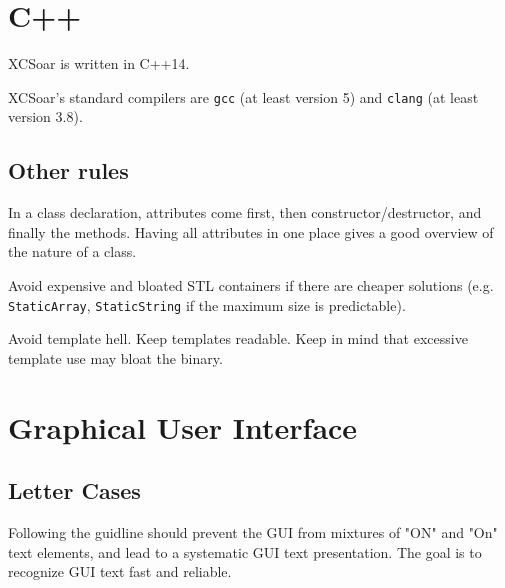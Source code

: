 \documentclass[a4paper,12pt]{refrep}
\begin{document}
\section{C++}

XCSoar is written in C++14.

XCSoar's standard compilers are \texttt{gcc} (at least version 5) and
\texttt{clang} (at least version 3.8).

\subsection{Other rules}

In a class declaration, attributes come first, then
constructor/destructor, and finally the methods.  Having all
attributes in one place gives a good overview of the nature of a
class.

Avoid expensive and bloated STL containers if there are cheaper
solutions (e.g. \texttt{StaticArray}, \texttt{StaticString} if the
maximum size is predictable).

Avoid template hell.  Keep templates readable.  Keep in mind that
excessive template use may bloat the binary.

\section{Graphical User Interface}
\subsection{Letter Cases}

Following the guidline should prevent the GUI from mixtures of "ON" and 
"On" text elements, and lead to a systematic GUI text presentation. 
The goal is to recognize GUI text fast and reliable.
\end{document}
